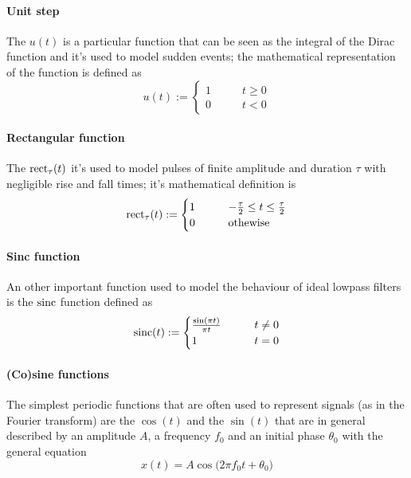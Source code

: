 	\paragraph{Unit step} The  $u(t)$ is a particular function that can be seen as the integral of the Dirac function and it's used to model sudden events; the mathematical representation of the function is defined as
	\begin{equation}
		u(t) := \begin{cases}
			1 \qquad & t \geq 0 \\
			0 \qquad & t < 0
		\end{cases}
	\end{equation}

	\paragraph{Rectangular function} The  $\textrm{rect}_\tau(t)$ it's used to model pulses of finite amplitude and duration $\tau$ with negligible rise and fall times; it's mathematical definition is
	\begin{equation}
		\textrm{rect}_\tau (t) := \begin{cases}
			1 \qquad & -\frac \tau2 \leq t \leq \frac \tau 2 \\
			0 & \textrm{othewise}
		\end{cases}
	\end{equation}

	\paragraph{Sinc function} An other important function used to model the behaviour of ideal lowpass filters is the  $\textrm{sinc}$ function defined as
	\begin{equation}
		\textrm{sinc}(t) := \begin{cases}
			\frac{\sin(\pi t)}{\pi t} \qquad & t \neq 0 \\
			1 & t = 0
		\end{cases}
	\end{equation}

	\paragraph{(Co)sine functions} The simplest periodic functions that are often used to represent signals (as in the Fourier transform) are the  $\cos(t)$ and the  $\sin(t)$ that are in general described by an amplitude $A$, a frequency $f_0$ and an initial phase $\theta_0$ with the general equation
	\begin{equation}
		x(t) = A \cos \big( 2\pi f_0 t + \theta_0 \big)
	\end{equation}

